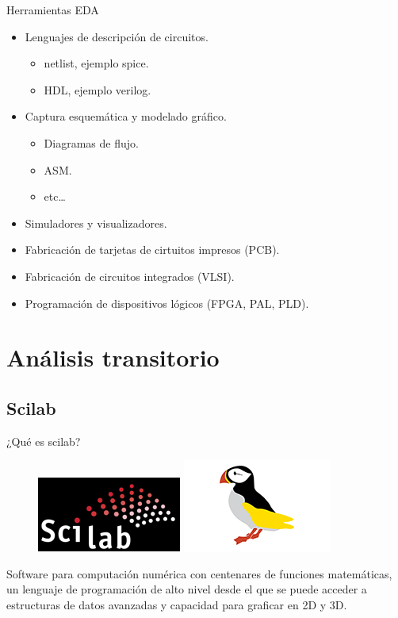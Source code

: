\documentclass{beamer}
\begin{document}
\begin{frame}{Herramientas EDA}
  \begin{itemize}
  \item Lenguajes de descripción de circuitos.
    \begin{itemize}
    \item netlist, ejemplo spice.
    \item HDL, ejemplo verilog.
    \end{itemize}
    \vspace{9pt}
  \item Captura esquemática y modelado gráfico.
    \begin{itemize}
    \item Diagramas de flujo.
    \item ASM.
    \item etc\dots{}
    \end{itemize}

    \vspace{9pt}
  \item Simuladores y visualizadores.
    \vspace{9pt}
  \item Fabricación de tarjetas de cirtuitos impresos (PCB).
  \item Fabricación de circuitos integrados (VLSI).
  \item Programación de dispositivos lógicos (FPGA, PAL, PLD).
  \end{itemize}
\end{frame}

\section{Análisis transitorio}


\subsection[Scilab - \url{http://www.scilab.org}]{Scilab}

\begin{frame}{¿Qué es scilab?}
  \begin{figure}
    \centering
    \includegraphics{scilab/img/Scilab-WebSite.png}
    \includegraphics{scilab/img/Puffin-Logo_medium}
  \end{figure}
  Software para computación numérica con centenares de funciones matemáticas, un lenguaje de programación de alto nivel desde el que se puede acceder a estructuras de datos avanzadas y capacidad para graficar en 2D y 3D.
\end{frame}
\end{document}

